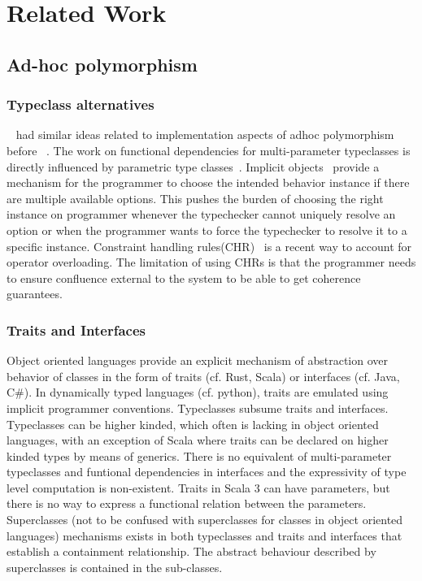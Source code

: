 \documentclass[screen,nonacm,manuscript,review]{acmart} %
\begin{document}
\section{Related Work}\label{sec:related-work}
\subsection{Ad-hoc polymorphism}\label{sec:rw-adhoc-poly}
\subsubsection{Typeclass alternatives}
~\citet{kaes_parametric_1988} had similar ideas related to
implementation aspects of adhoc polymorphism before
~\citet{wadler_polymorphism_1989}. The work on functional dependencies
for multi-parameter typeclasses is directly influenced by parametric
type classes~\cite{chen_parametric_1992}. Implicit
objects~\cite{oliveira_typeclasses_2010} provide a mechanism for the
programmer to choose the intended behavior instance if
there are multiple available options. This pushes the burden of choosing the
right instance on programmer whenever the typechecker cannot uniquely
resolve an option or when the programmer wants to force the
typechecker to resolve it to a specific instance. Constraint handling
rules(CHR)~\cite{fruhwirth_theory_1998,stuckey_theory_2005} is a recent
way to account for operator overloading. The limitation of using CHRs
is that the programmer needs to ensure confluence external to the
system to be able to get coherence guarantees.

\subsubsection{Traits and Interfaces}
Object oriented languages provide an explicit mechanism of abstraction
over behavior of classes in the form of traits (cf. Rust, Scala) or
interfaces (cf. Java, C\#). In dynamically typed languages
(cf. python), traits are emulated using implicit programmer
conventions. Typeclasses subsume traits and interfaces. Typeclasses
can be higher kinded, which often is lacking in object oriented
languages, with an exception of Scala where traits can be declared on
higher kinded types by means of generics. There is no equivalent of
multi-parameter typeclasses and funtional dependencies in interfaces
and the expressivity of type level computation is non-existent. Traits
in Scala 3 can have parameters, but there is no way to express a
functional relation between the parameters. Superclasses (not to be
confused with superclasses for classes in object oriented languages)
mechanisms exists in both typeclasses and traits and interfaces that
establish a containment relationship. The abstract behaviour described
by superclasses is contained in the sub-classes.
\end{document}
